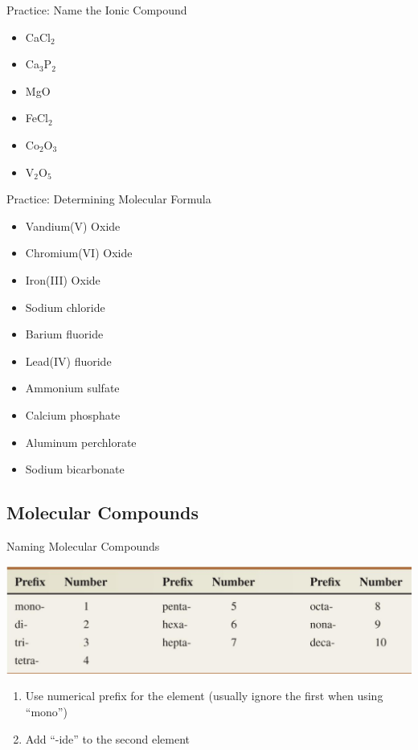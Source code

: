 \documentclass[11pt]{beamer}
\begin{document}
\begin{frame}{Practice: Name the Ionic Compound}
  \begin{itemize}
  \item CaCl$_2$
  \item Ca$_3$P$_2$
  \item MgO
  \item FeCl$_2$
  \item Co$_2$O$_3$
  \item V$_2$O$_5$
  \end{itemize}
\end{frame}

\begin{frame}{Practice: Determining Molecular Formula}
  \begin{itemize}
  \item Vandium(V) Oxide
  \item Chromium(VI) Oxide
  \item Iron(III) Oxide
  \item Sodium chloride
  \item Barium fluoride
  \item Lead(IV) fluoride
  \item Ammonium sulfate
  \item Calcium phosphate
  \item Aluminum perchlorate
  \item Sodium bicarbonate
  \end{itemize}
\end{frame}

\subsection{Molecular Compounds}

\begin{frame}{Naming Molecular Compounds}
  \begin{center}
    \includegraphics[width=\linewidth]{prefix_name}
  \end{center}
  
  \begin{enumerate}
  \item Use numerical prefix for the element (usually ignore the first
    when using ``mono'')
  \item Add ``-ide'' to the second element
  \end{enumerate}
\end{frame}
\end{document}
